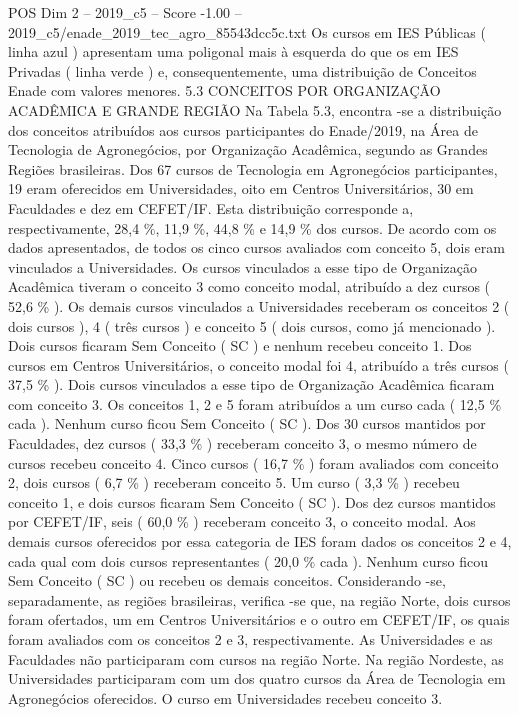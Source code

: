 \begin{textsample}{POS Dim 2 – 2019\_c5 – Score -1.00 – 2019\_c5/enade\_2019\_tec\_agro\_85543dcc5c.txt}
Os cursos em IES Públicas ( linha azul ) apresentam uma poligonal mais à esquerda do que os em IES Privadas ( linha verde ) e, consequentemente, uma distribuição de Conceitos Enade com valores menores. 5.3 CONCEITOS POR ORGANIZAÇÃO ACADÊMICA E GRANDE REGIÃO Na Tabela 5.3, encontra -se a distribuição dos conceitos atribuídos aos cursos participantes do Enade/2019, na Área de Tecnologia de Agronegócios, por Organização Acadêmica, segundo as Grandes Regiões brasileiras.
Dos 67 cursos de Tecnologia em Agronegócios participantes, 19 eram oferecidos em Universidades, oito em Centros Universitários, 30 em Faculdades e dez em CEFET/IF.
Esta distribuição corresponde a, respectivamente, 28,4 \%, 11,9 \%, 44,8 \% e 14,9 \% dos cursos.
De acordo com os dados apresentados, de todos os cinco cursos avaliados com conceito 5, dois eram vinculados a Universidades.
Os cursos vinculados a esse tipo de Organização Acadêmica tiveram o conceito 3 como conceito modal, atribuído a dez cursos ( 52,6 \% ).
Os demais cursos vinculados a Universidades receberam os conceitos 2 ( dois cursos ), 4 ( três cursos ) e conceito 5 ( dois cursos, como já mencionado ).
Dois cursos ficaram Sem Conceito ( SC ) e nenhum recebeu conceito 1.
Dos cursos em Centros Universitários, o conceito modal foi 4, atribuído a três cursos ( 37,5 \% ).
Dois cursos vinculados a esse tipo de Organização Acadêmica ficaram com conceito 3.
Os conceitos 1, 2 e 5 foram atribuídos a um curso cada ( 12,5 \% cada ).
Nenhum curso ficou Sem Conceito ( SC ).
Dos 30 cursos mantidos por Faculdades, dez cursos ( 33,3 \% ) receberam conceito 3, o mesmo número de cursos recebeu conceito 4.
Cinco cursos ( 16,7 \% ) foram avaliados com conceito 2, dois cursos ( 6,7 \% ) receberam conceito 5.
Um curso ( 3,3 \% ) recebeu conceito 1, e dois cursos ficaram Sem Conceito ( SC ).
Dos dez cursos mantidos por CEFET/IF, seis ( 60,0 \% ) receberam conceito 3, o conceito modal.
Aos demais cursos oferecidos por essa categoria de IES foram dados os conceitos 2 e 4, cada qual com dois cursos representantes ( 20,0 \% cada ).
Nenhum curso ficou Sem Conceito ( SC ) ou recebeu os demais conceitos.
Considerando -se, separadamente, as regiões brasileiras, verifica -se que, na região Norte, dois cursos foram ofertados, um em Centros Universitários e o outro em CEFET/IF, os quais foram avaliados com os conceitos 2 e 3, respectivamente.
As Universidades e as Faculdades não participaram com cursos na região Norte.
Na região Nordeste, as Universidades participaram com um dos quatro cursos da Área de Tecnologia em Agronegócios oferecidos.
O curso em Universidades recebeu conceito 3.

\end{textsample}
